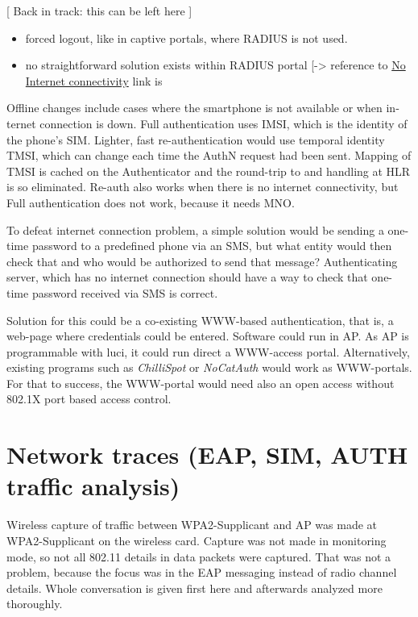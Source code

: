 \documentclass[12pt,a4paper,english]{tutthesis}
\begin{document}
\begin{otherlanguage}{english}
[ Back in track: this can be left here ]

\begin{itemize}
\item forced logout, like in captive portals, where RADIUS is not used.
\item no straightforward solution exists within RADIUS
portal [-> reference to \hyperref[text:nointernet]{No Internet connectivity} link is
\end{itemize}

Offline changes include cases where the smartphone is not available or
when internet connection is down.  Full authentication uses IMSI,
which is the identity of the phone's SIM.  Lighter, fast
re-authentication would use temporal identity TMSI, which can change
each time the AuthN request had been sent. Mapping of TMSI is cached
on the Authenticator and the round-trip to and handling at HLR is so
eliminated. Re-auth also works when there is no internet connectivity,
but Full authentication does not work, because it needs MNO.





To defeat internet connection problem, a simple solution would be
sending a one-time password to a predefined phone via an SMS, but what
entity would then check that and who would be authorized to send that message?
Authenticating server, which has no internet connection should 
have a way to check that one-time password received via SMS is correct.

Solution for this could be a co-existing WWW-based authentication, that
is, a web-page where credentials could be entered.
Software could run in AP. As AP is programmable with luci, it could
run direct  a WWW-access portal. Alternatively, existing programs such
as \emph{ChilliSpot} or \emph{NoCatAuth} would work as WWW-portals.
For that to success, the WWW-portal would need also an open access without
802.1X port based access control.


\section{Network traces (EAP, SIM, AUTH traffic analysis)}
\label{sec-5-4}
Wireless capture of traffic between WPA2-Supplicant and AP was made at
WPA2-Supplicant on the wireless card. Capture was
not made in monitoring mode, so not all 802.11 details in
data packets were captured\cite{wireshark-capture}.
That was not a problem, because the focus was 
in the EAP messaging instead of radio channel details.
Whole conversation is given first here and afterwards analyzed more
thoroughly.


\end{otherlanguage}
\end{document}
